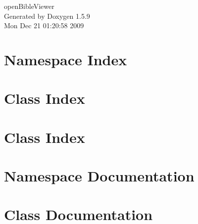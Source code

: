 \documentclass[a4paper]{book}
\begin{document}
\hypersetup{pageanchor=false}
\begin{titlepage}
\vspace*{7cm}
\begin{center}
{\Large openBibleViewer }\\
\vspace*{1cm}
{\large Generated by Doxygen 1.5.9}\\
\vspace*{0.5cm}
{\small Mon Dec 21 01:20:58 2009}\\
\end{center}
\end{titlepage}
\clearemptydoublepage
{}
\tableofcontents
\clearemptydoublepage
{}
\hypersetup{pageanchor=true}
\chapter{Namespace Index}

\chapter{Class Index}

\chapter{Class Index}

\chapter{Namespace Documentation}

\chapter{Class Documentation}






























\printindex
\end{document}
